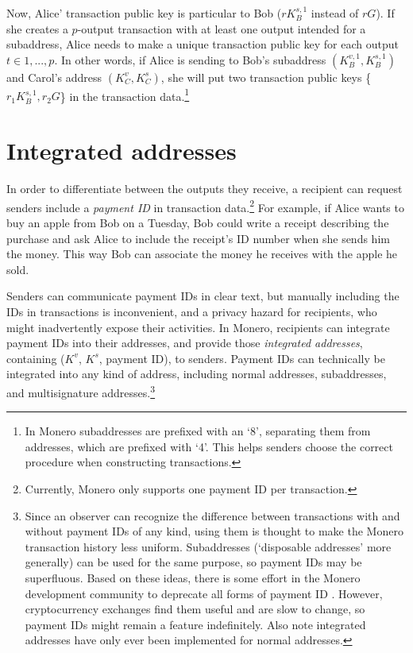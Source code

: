 Now, Alice' transaction public key is particular to Bob ($r K_B^{s,1}$ instead of $r G$). If she creates a $p$-output transaction with at least one output intended for a subaddress, Alice needs to make a unique transaction public key for each output $t \in 1,...,p$. In other words, if Alice is sending to Bob's subaddress $(K_B^{v,1}, K_B^{s,1})$ and Carol's address $(K_C^v, K_C^s)$, she will put two transaction public keys \{$r_1 K_B^{s,1},r_2 G$\} in the transaction data.\footnote{In Monero subaddresses are prefixed with an ‘8’, separating them from addresses, which are prefixed with ‘4’. This helps senders choose the correct procedure when constructing transactions.}


\section{Integrated addresses}
\label{sec:integrated-addresses}

In order to differentiate between the outputs they receive, a recipient can request senders include a {\em payment ID} in transaction data.\footnote{Currently, Monero only supports one payment ID per transaction.} For example, if Alice wants to buy an apple from Bob on a Tuesday, Bob could write a receipt describing the purchase and ask Alice to include the receipt's ID number when she sends him the money. This way Bob can associate the money he receives with the apple he sold.

Senders can communicate payment IDs in clear text, but manually including the IDs in transactions is inconvenient, and a privacy hazard for recipients, who might inadvertently expose their activities. In Monero, recipients can integrate payment IDs into their addresses, and provide those {\em integrated addresses}, containing ($K^v$, $K^s$, payment ID), to senders. Payment IDs can technically be integrated into any kind of address, including normal addresses, subaddresses, and multisignature addresses.\footnote{Since an observer can recognize the difference between transactions with and without payment IDs of any kind, using them is thought to make the Monero transaction history less uniform. Subaddresses (`disposable addresses' more generally) can be used for the same purpose, so payment IDs may be superfluous. Based on these ideas, there is some effort in the Monero development community to deprecate all forms of payment ID \cite{deprecating-payment-ids}. However, cryptocurrency exchanges find them useful and are slow to change, so payment IDs might remain a feature indefinitely. Also note integrated addresses have only ever been implemented for normal addresses.}

